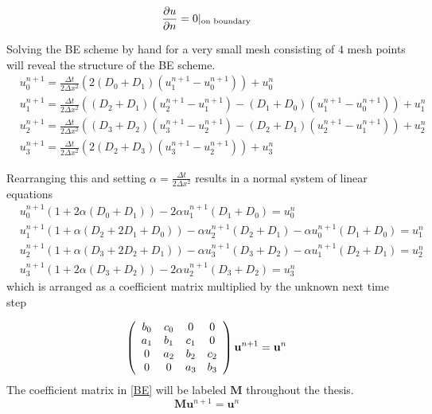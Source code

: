 \begin{equation}\label{theory:Neumann_boundaries}
 \frac{\partial u}{\partial n} = 0|_{\text{on boundary}}
\end{equation}

\noindent Solving the BE scheme by hand for a very small mesh consisting of $4$ mesh points will reveal the structure of the BE scheme.
\begin{align*}
 &u^{n+1}_0 =  \frac{\Delta t}{2\Delta x^2}\left(2(D_{0}+D_{1})(u^{n+1}_{1}-u^{n+1}_{0})\right) + u^n_0\\
 &u^{n+1}_1 = \frac{\Delta t}{2\Delta x^2}\left((D_{2}+D_{1})(u^{n+1}_{2}-u^{n+1}_{1})-(D_{1}+D_{0})(u^{n+1}_{1}-u^{n+1}_{0})\right) + u^n_1\\
 &u^{n+1}_2 = \frac{\Delta t}{2\Delta x^2}\left((D_{3}+D_{2})(u^{n+1}_{3}-u^{n+1}_{2})-(D_{2}+D_{1})(u^{n+1}_{2}-u^{n+1}_{1})\right) + u^n_2 \\
 &u^{n+1}_3 =  \frac{\Delta t}{2\Delta x^2}\left(2(D_{2}+D_{3})(u^{n+1}_{3}-u^{n+1}_{2})\right) + u^n_3
\end{align*}

\noindent Rearranging this and setting $\alpha = \frac{\Delta t}{2\Delta x^2}$ results in a normal system of linear equations
\begin{align*}
 &u^{n+1}_0\left(1+2\alpha(D_0+D_1)\right)- 2\alpha u^{n+1}_{1}(D_1+D_0) =  u^n_0\\
 &u^{n+1}_1\left(1+\alpha(D_2+2D_1+D_0)\right)-\alpha u^{n+1}_{2}(D_2+D_1)-\alpha u^{n+1}_{0}(D_1+D_0) = u^n_1\\
 &u^{n+1}_2\left(1+\alpha(D_3+2D_2+D_1)\right)-\alpha u^{n+1}_{3}(D_3+D_2)-\alpha u^{n+1}_{1}(D_2+D_1) = u^n_2\\
 &u^{n+1}_3\left(1+2\alpha(D_3+D_2)\right)- 2\alpha u^{n+1}_{2}(D_3+D_2) =  u^n_3
\end{align*}
which is arranged as a coefficient matrix multiplied by the unknown next time step

\begin{align}\label{BE}
 \left(\begin{array}{c c c c}
        b_0 & c_0 &0 &0 \\
        a_1 & b_1 & c_1 &0 \\
        0& a_2 & b_2& c_2\\
        0& 0& a_3 & b_3\\
       \end{array}\right)\mathbf{u}^{n+1} = \mathbf{u}^{n}
\end{align}
\noindent The coefficient matrix in \eqref{BE} will be labeled $\mathbf M$ throughout the thesis.
\begin{equation}\label{theory:BE:linear_system}
  \mathbf{M}\mathbf{u}^{n+1} = \mathbf{u}^{n}
\end{equation}

